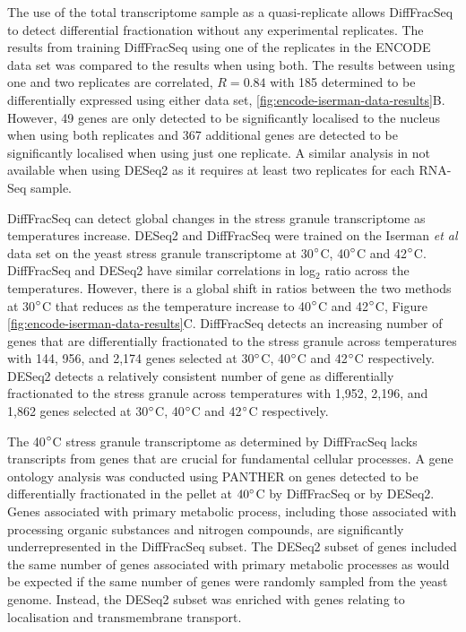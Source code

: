 \documentclass[../main.tex]{subfiles}
\begin{document}
The use of the total transcriptome sample as a quasi-replicate allows DiffFracSeq to detect differential fractionation without any experimental replicates.
The results from training DiffFracSeq using one of the replicates in the ENCODE data set was compared to the results when using both. 
The results between using one and two replicates are correlated, $R = 0.84$ with 185 determined to be differentially expressed using either data set, \ref{fig:encode-iserman-data-results}B.
However, 49 genes are only detected to be significantly localised to the nucleus when using both replicates and 367 additional genes are detected to be significantly localised when using just one replicate.
A similar analysis in not available when using DESeq2 as it requires at least two replicates for each RNA-Seq sample.

DiffFracSeq can detect global changes in the stress granule transcriptome as temperatures increase.
DESeq2 and DiffFracSeq were trained on the Iserman \textit{et al} data set on the yeast stress granule transcriptome at 30$\degree$C, 40$\degree$C and 42$\degree$C. 
DiffFracSeq and DESeq2 have similar correlations in log$_2$ ratio across the temperatures. However, there is a global shift in ratios between the two methods at 30$\degree$C that reduces as the temperature increase to 40$\degree$C and 42$\degree$C, Figure \ref{fig:encode-iserman-data-results}C.
DiffFracSeq detects an increasing number of genes that are differentially fractionated to the stress granule across temperatures with 144, 956, and 2,174 genes selected at 30$\degree$C, 40$\degree$C and 42$\degree$C respectively.
DESeq2 detects a relatively consistent number of gene as differentially fractionated to the stress granule across temperatures with 1,952, 2,196, and 1,862 genes selected at 30$\degree$C, 40$\degree$C and 42$\degree$C respectively.

The 40$\degree$C stress granule transcriptome as determined by DiffFracSeq lacks transcripts from genes that are crucial for fundamental cellular processes.
A gene ontology analysis was conducted using PANTHER on genes detected to be differentially fractionated in the pellet at $40\degree$C by DiffFracSeq or by DESeq2.
Genes associated with primary metabolic process, including those associated with processing organic substances and nitrogen compounds, are significantly underrepresented in the DiffFracSeq subset.
The DESeq2 subset of genes included the same number of genes associated with primary metabolic processes as would be expected if the same number of genes were randomly sampled from the yeast genome.
Instead, the DESeq2 subset was enriched with genes relating to localisation and transmembrane transport. 
\end{document}
